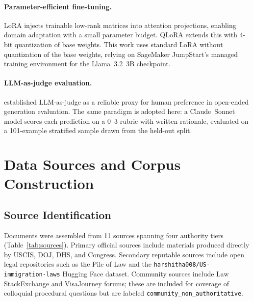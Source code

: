 \documentclass[11pt]{article}
\begin{document}
\paragraph{Parameter-efficient fine-tuning.}
LoRA \citep{hu2022lora} injects trainable low-rank matrices into attention projections, enabling domain adaptation with a small parameter budget. QLoRA \citep{dettmers2023qlora} extends this with 4-bit quantization of base weights. This work uses standard LoRA without quantization of the base weights, relying on SageMaker JumpStart's managed training environment for the Llama~3.2~3B checkpoint.

\paragraph{LLM-as-judge evaluation.}
\citet{zheng2023judging} established LLM-as-judge as a reliable proxy for human preference in open-ended generation evaluation. The same paradigm is adopted here: a Claude~Sonnet model scores each prediction on a 0--3 rubric with written rationale, evaluated on a 101-example stratified sample drawn from the held-out split.

\section{Data Sources and Corpus Construction}
\label{sec:corpus}

\subsection{Source Identification}
\label{sec:sources}

Documents were assembled from 11 sources spanning four authority tiers (Table~\ref{tab:sources}). Primary official sources include materials produced directly by USCIS, DOJ, DHS, and Congress. Secondary reputable sources include open legal repositories such as the Pile of Law and the \texttt{harshitha008/US\allowbreak-immigration\allowbreak-laws} Hugging Face dataset. Community sources include Law StackExchange and VisaJourney forums; these are included for coverage of colloquial procedural questions but are labeled \mbox{\texttt{community\_non\_authoritative}}.
\end{document}

